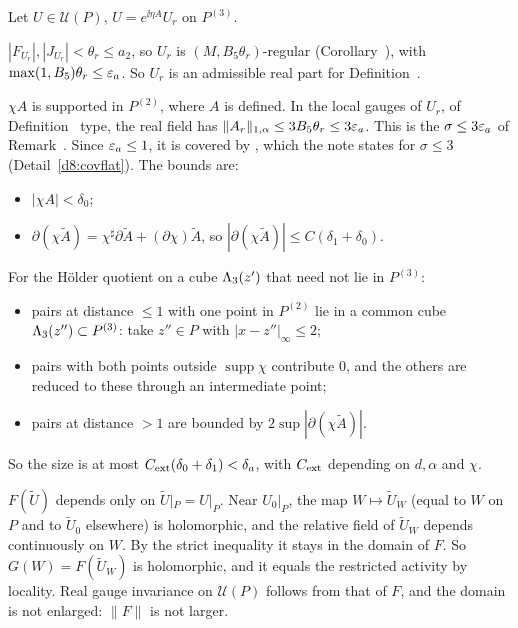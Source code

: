 \begin{detail}\label{d8:bgtog}
Let $U\in\mathcal U(P)$, $U=e^{\ii\eta A}U_r$ on $P^{(3)}$.
\begin{step}
$|F_{U_r}|,|J_{U_r}|<\theta_r\le a_2$, so $U_r$ is $(M,B_5\theta_r)$-regular (Corollary~), with $\max(1,B_5)\theta_r\le\varepsilon_a$. So $U_r$ is an admissible real part for Definition~.
\end{step}
\begin{step}
$\chi A$ is supported in $P^{(2)}$, where $A$ is defined. In the local gauges of $U_r$, of Definition~ type, the real field has $\|A_r\|_{1,\alpha}\le3B_5\theta_r\le3\varepsilon_a$. This is the $\sigma\le3\varepsilon_a$ of Remark~. Since $\varepsilon_a\le1$, it is covered by , which the note states for $\sigma\le3$ (Detail~\ref{d8:covflat}). The bounds are:
\begin{itemize}
\item $|\chi A|<\delta_0$;
\item $\partial(\chi\tilde A)=\chi^\sharp\partial\tilde A+(\partial\chi)\tilde A$, so $|\partial(\chi\tilde A)|\le C(\delta_1+\delta_0)$.
\end{itemize}
For the H\"older quotient on a cube $\Lambda_3(z')$ that need not lie in $P^{(3)}$:
\begin{itemize}
\item pairs at distance $\le1$ with one point in $P^{(2)}$ lie in a common cube $\Lambda_3(z'')\subset P^{(3)}$: take $z''\in P$ with $|x-z''|_\infty\le2$;
\item pairs with both points outside $\operatorname{supp}\chi$ contribute $0$, and the others are reduced to these through an intermediate point;
\item pairs at distance $>1$ are bounded by $2\sup|\partial(\chi\tilde A)|$.
\end{itemize}
So the size is at most $C_{\rm ext}(\delta_0+\delta_1)<\delta_a$, with $C_{\rm ext}$ depending on $d,\alpha$ and $\chi$.
\end{step}
\begin{step}
$F(\tilde U)$ depends only on $\tilde U|_P=U|_P$. Near $U_0|_P$, the map $W\mapsto\tilde U_W$ (equal to $W$ on $P$ and to $\tilde U_0$ elsewhere) is holomorphic, and the relative field of $\tilde U_W$ depends continuously on $W$. By the strict inequality it stays in the domain of $F$. So $G(W)=F(\tilde U_W)$ is holomorphic, and it equals the restricted activity by locality. Real gauge invariance on $\mathcal U(P)$ follows from that of $F$, and the domain is not enlarged: $\|F\|$ is not larger.
\end{step}
\end{detail}


